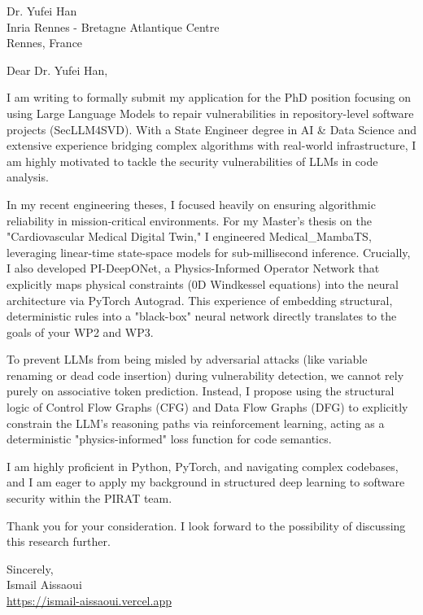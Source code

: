 \documentclass[11pt, a4paper]{letter}
\begin{document}
\begin{letter}{Dr. Yufei Han \\ Inria Rennes - Bretagne Atlantique Centre \\ Rennes, France}
\opening{Dear Dr. Yufei Han,}

I am writing to formally submit my application for the PhD position focusing on using Large Language Models to repair vulnerabilities in repository-level software projects (SecLLM4SVD). With a State Engineer degree in AI \& Data Science and extensive experience bridging complex algorithms with real-world infrastructure, I am highly motivated to tackle the security vulnerabilities of LLMs in code analysis.

In my recent engineering theses, I focused heavily on ensuring algorithmic reliability in mission-critical environments. For my Master's thesis on the "Cardiovascular Medical Digital Twin," I engineered Medical\_MambaTS, leveraging linear-time state-space models for sub-millisecond inference. Crucially, I also developed PI-DeepONet, a Physics-Informed Operator Network that explicitly maps physical constraints (0D Windkessel equations) into the neural architecture via PyTorch Autograd. This experience of embedding structural, deterministic rules into a "black-box" neural network directly translates to the goals of your WP2 and WP3. 

To prevent LLMs from being misled by adversarial attacks (like variable renaming or dead code insertion) during vulnerability detection, we cannot rely purely on associative token prediction. Instead, I propose using the structural logic of Control Flow Graphs (CFG) and Data Flow Graphs (DFG) to explicitly constrain the LLM's reasoning paths via reinforcement learning, acting as a deterministic "physics-informed" loss function for code semantics.

I am highly proficient in Python, PyTorch, and navigating complex codebases, and I am eager to apply my background in structured deep learning to software security within the PIRAT team.

Thank you for your consideration. I look forward to the possibility of discussing this research further.

\closing{Sincerely, \\ Ismail Aissaoui \\ \href{https://ismail-aissaoui.vercel.app}{https://ismail-aissaoui.vercel.app}}
\end{letter}
\end{document}
